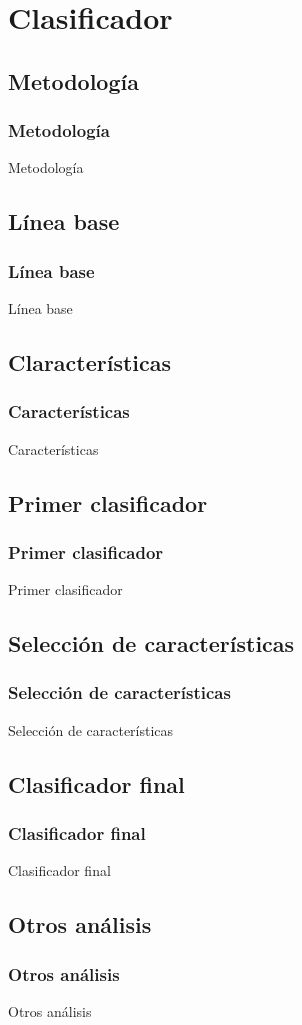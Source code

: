 \section{Clasificador}

\subsection{Metodología}
\begin{frame}
    \frametitle{Metodología}
    Metodología
\end{frame}

\subsection{Línea base}
\begin{frame}
    \frametitle{Línea base}
    Línea base
\end{frame}

\subsection{Claracterísticas}
\begin{frame}
    \frametitle{Características}
    Características
\end{frame}

\subsection{Primer clasificador}
\begin{frame}
    \frametitle{Primer clasificador}
    Primer clasificador
\end{frame}

\subsection{Selección de características}
\begin{frame}
    \frametitle{Selección de características}
    Selección de características
\end{frame}

\subsection{Clasificador final}
\begin{frame}
    \frametitle{Clasificador final}
    Clasificador final
\end{frame}

\subsection{Otros análisis}
\begin{frame}
    \frametitle{Otros análisis}
    Otros análisis
\end{frame}
